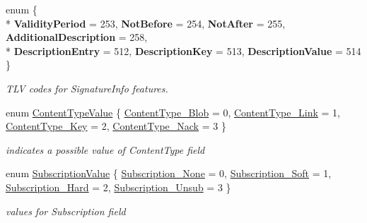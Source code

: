 \begin{DoxyCompactItemize}
\item 
enum \{ \\*
{\bfseries Validity\+Period} = 253, 
{\bfseries Not\+Before} = 254, 
{\bfseries Not\+After} = 255, 
{\bfseries Additional\+Description} = 258, 
\\*
{\bfseries Description\+Entry} = 512, 
{\bfseries Description\+Key} = 513, 
{\bfseries Description\+Value} = 514
 \}\begin{DoxyCompactList}\small\item\em T\+LV codes for Signature\+Info features. \end{DoxyCompactList}
\item 
enum \hyperlink{namespacendn_1_1tlv_aaa845994b4f59fdab8bf0bbbe51e204b}{Content\+Type\+Value} \{ \hyperlink{namespacendn_1_1tlv_aaa845994b4f59fdab8bf0bbbe51e204ba60ce94ccdd53ff0d849d6f51e5be2011}{Content\+Type\+\_\+\+Blob} = 0, 
\hyperlink{namespacendn_1_1tlv_aaa845994b4f59fdab8bf0bbbe51e204ba5cae8a36304794226ce4183f1aad4307}{Content\+Type\+\_\+\+Link} = 1, 
\hyperlink{namespacendn_1_1tlv_aaa845994b4f59fdab8bf0bbbe51e204ba3438d1623c7bcc6f40704be6b4875e9b}{Content\+Type\+\_\+\+Key} = 2, 
\hyperlink{namespacendn_1_1tlv_aaa845994b4f59fdab8bf0bbbe51e204bacd9aaacbd3185c346c4d9e86aa336e17}{Content\+Type\+\_\+\+Nack} = 3
 \}\begin{DoxyCompactList}\small\item\em indicates a possible value of Content\+Type field \end{DoxyCompactList}
\item 
enum \hyperlink{namespacendn_1_1tlv_ae53c9dcbe75ebaaf6af6e90e6a7380e3}{Subscription\+Value} \{ \hyperlink{namespacendn_1_1tlv_ae53c9dcbe75ebaaf6af6e90e6a7380e3a405450e35e9a0e4eda742ec299286c18}{Subscription\+\_\+\+None} = 0, 
\hyperlink{namespacendn_1_1tlv_ae53c9dcbe75ebaaf6af6e90e6a7380e3ae78fa17ea05f890da234cb58ea80c88c}{Subscription\+\_\+\+Soft} = 1, 
\hyperlink{namespacendn_1_1tlv_ae53c9dcbe75ebaaf6af6e90e6a7380e3ae1da15b8e0086f723112c5af6a7f4369}{Subscription\+\_\+\+Hard} = 2, 
\hyperlink{namespacendn_1_1tlv_ae53c9dcbe75ebaaf6af6e90e6a7380e3ad6ba91f51c2be4c0ffd56d0d70cbdf55}{Subscription\+\_\+\+Unsub} = 3
 \}\begin{DoxyCompactList}\small\item\em values for Subscription field \end{DoxyCompactList}
\end{DoxyCompactItemize}
